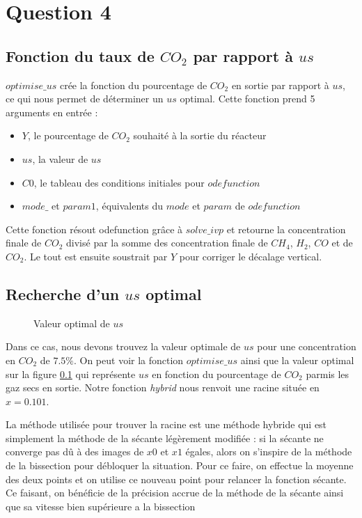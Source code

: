 \documentclass[11pt]{report}
\newcommand{\mychapter}[2]{
    \setcounter{chapter}{#1}
    \setcounter{section}{0}
    \chapter*{#2}
    \addcontentsline{toc}{chapter}{#2}
}
\begin{document}
    \mychapter{4}{Question 4}
        \section{Fonction du taux de $CO_2$ par rapport à $us$}
            $optimise\_us$ crée la fonction du pourcentage de $CO_2$ en sortie par rapport à $us$,
            ce qui nous permet de déterminer un $us$ optimal.
            Cette fonction prend 5 arguments en entrée :
            \begin{itemize}
                \item $Y$, le pourcentage de $CO_2$ souhaité à la sortie du réacteur
                \item $us$, la valeur de $us$
                \item $C0$, le tableau des conditions initiales pour $odefunction$
                \item $mode\_$ et $param1$, équivalents du $mode$ et $param$ de $odefunction$
            \end{itemize}
            Cette fonction résout odefunction grâce à $solve\_ivp$ et retourne la concentration
            finale de $CO_2$ divisé par la somme des concentration finale de $CH_4$, $H_2$,
            $CO$ et de $CO_2$. Le tout est ensuite soustrait par $Y$ pour corriger le décalage vertical.
        \section{Recherche d'un $us$ optimal}
            \begin{figure}[h]
                \centering
                
                \caption{Valeur optimal de $us$}
                \label{graph:us}
            \end{figure}
            Dans ce cas, nous devons trouvez la valeur optimale de $us$ pour une concentration
            en $CO_2$ de $7.5\%$.
            On peut voir la fonction $optimise\_us$ ainsi que la valeur optimal sur la figure \ref{graph:us}
            qui représente $us$ en fonction du pourcentage de $CO_2$ parmis les gaz secs en sortie.
            Notre fonction \textit{hybrid} nous renvoit une racine située en $x = 0.101$.
            \par
            La méthode utilisée pour trouver la racine est une méthode hybride qui est simplement
            la méthode de la sécante légèrement modifiée : si la sécante ne converge pas dû à des
            images de $x0$ et $x1$ égales,
            alors on s'inspire de la méthode de la bissection pour  débloquer la situation.
            Pour ce faire, on effectue la moyenne des deux points et on utilise ce nouveau point pour relancer
            la fonction sécante. Ce faisant, on bénéficie de la précision accrue de la méthode de la sécante
            ainsi que sa vitesse bien supérieure a la bissection
\end{document}
